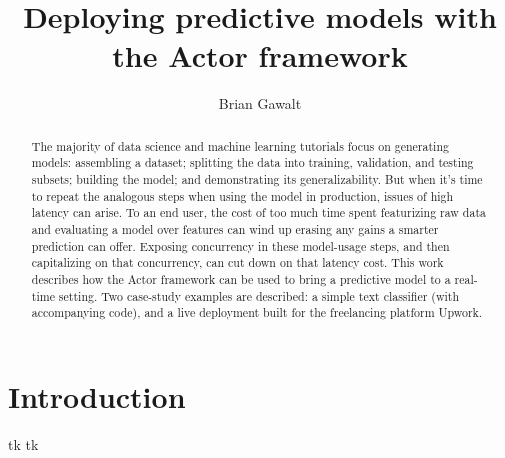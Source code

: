\documentclass{article}
\begin{document}
\title{Deploying predictive models with the Actor framework}
\author{Brian Gawalt}

\maketitle


\begin{abstract}
The majority of data science and machine learning tutorials focus on generating models: assembling a dataset; splitting the data into training, validation, and testing subsets; building the model; and demonstrating its generalizability. But when it's time to repeat the analogous steps when using the model in production, issues of high latency can arise. To an end user, the cost of too much time spent featurizing raw data and evaluating a model over features can wind up erasing any gains a smarter prediction can offer. Exposing concurrency in these model-usage steps, and then capitalizing on that concurrency, can cut down on that latency cost. This work describes how the Actor framework can be used to bring a predictive model to a real-time setting. Two case-study examples are described: a simple text classifier (with accompanying code), and a live deployment built for the freelancing platform Upwork.
\end{abstract}

\section{Introduction}

tk tk
\end{document}
